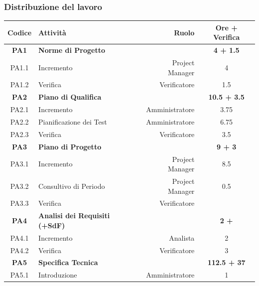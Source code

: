 \documentclass[12pt,a4paper,titlepage]{article}
\begin{document}
	\subsubsection{Distribuzione del lavoro}{
		\small
		{\renewcommand\arraystretch{1.1} %
			\begin{tabular}{|c|l|r|c|}
				\hline
				{\textbf{Codice}}&{\textbf{Attività}}&{\textbf{Ruolo}}&{\textbf{Ore + Verifica}}\\
				\hline
				\textbf{PA1} & \textbf{Norme di Progetto} & & \textbf{4 + 1.5 } \\
				
				PA1.1 & Incremento & Project Manager & 4 \\
				
				PA1.2 &	Verifica & Verificatore & 1.5 \\
				\hline
				\textbf{PA2} & \textbf{Piano di Qualifica} & & \textbf{10.5 + 3.5 } \\
				
				PA2.1 & Incremento & Amministratore & 3.75 \\
				
				PA2.2 & Pianificazione dei Test & Amministratore & 6.75 \\
				
				PA2.3 & Verifica & Verificatore & 3.5 \\
				\hline
				\textbf{PA3} & \textbf{Piano di Progetto} & & \textbf{9 + 3} \\
				
				PA3.1 & Incremento & Project Manager & 8.5 \\
				
				PA3.2 & Consultivo di Periodo & Project Manager & 0.5 \\
				
				PA3.3 & Verifica & Verificatore &  \\
				\hline
				\textbf{PA4} & \textbf{Analisi dei Requisiti (+SdF)} & & \textbf{2 + } \\
				
				PA4.1 & Incremento & Analista & 2 \\
				
				PA4.2 & Verifica & Verificatore & 3 \\
				\hline
				\textbf{PA5} & \textbf{Specifica Tecnica} & & \textbf{112.5 + 37 } \\
				
				PA5.1 & Introduzione & Amministratore & 1 \\
				

\end{tabular}}}
\end{document}
